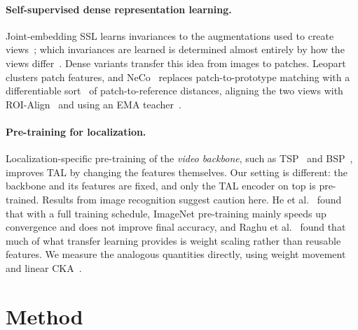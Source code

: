 \documentclass[10pt,a4paper]{article}
\begin{document}
\paragraph{Self-supervised dense representation learning.}
Joint-embedding SSL learns invariances to the augmentations used to create
views~\cite{chen2020simclr,grill2020byol,caron2021dino}; which invariances are learned is
determined almost entirely by how the views differ~\cite{tian2020goodviews}. Dense
variants transfer this idea from images to patches. Leopart~\cite{ziegler2022leopart}
clusters patch features, and NeCo~\cite{pariza2025neco} replaces patch-to-prototype
matching with a differentiable sort~\cite{prillo2020softsort} of patch-to-reference
distances, aligning the two views with ROI-Align~\cite{he2017maskrcnn} and using an EMA
teacher~\cite{tarvainen2017meanteacher}.

\paragraph{Pre-training for localization.}
Localization-specific pre-training of the \emph{video backbone}, such as
TSP~\cite{alwassel2021tsp} and BSP~\cite{xu2021bsp}, improves TAL by changing the features
themselves. Our setting is different: the backbone and its features are fixed, and only
the TAL encoder on top is pre-trained. Results from image recognition suggest caution
here. He et al.~\cite{he2019rethinking} found that with a full training schedule,
ImageNet pre-training mainly speeds up convergence and does not improve final accuracy,
and Raghu et al.~\cite{raghu2019transfusion} found that much of what transfer learning
provides is weight scaling rather than reusable features. We measure the analogous
quantities directly, using weight movement and linear CKA~\cite{kornblith2019cka}.

\section{Method}\label{sec:method}
\end{document}
